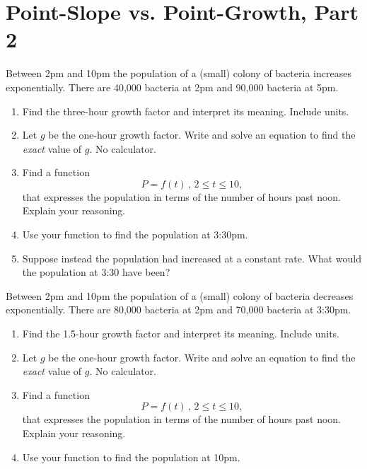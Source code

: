 \documentclass{ximera}
\begin{document}
\section{Point-Slope vs. Point-Growth, Part 2}
\begin{example} \label{Ex578788766}
Between 2pm and 10pm the population of a (small) colony of bacteria increases exponentially. There are 40,000 bacteria at 2pm and 90,000 bacteria at 5pm.

\begin{enumerate}
\item Find the three-hour growth factor and interpret its meaning. Include units.

\item Let $g$ be the one-hour growth factor. Write and solve an equation to find the \emph{exact} value of $g$. No calculator.

\item Find a function 
\[
      P = f(t) \, , \, 2\leq t \leq 10 ,
\]
that expresses the population in terms of the number of hours past noon. Explain your reasoning.

\item Use your function to find the population at 3:30pm.

\item Suppose instead the population had increased at a constant rate. What would the population at 3:30 have been?
\end{enumerate}
\end{example}

\begin{example} \label{Exdf5tr454tt88766}
Between 2pm and 10pm the population of a (small) colony of bacteria decreases exponentially. There are 80,000 bacteria at 2pm and 70,000 bacteria at 3:30pm.

\begin{enumerate}
\item Find the 1.5-hour growth factor and interpret its meaning. Include units.

\item Let $g$ be the one-hour growth factor. Write and solve an equation to find the \emph{exact} value of $g$. No calculator.

\item Find a function 
\[
      P = f(t) \, , \, 2\leq t \leq 10 ,
\]
that expresses the population in terms of the number of hours past noon. Explain your reasoning.

\item Use your function to find the population at 10pm.

\end{enumerate}
\end{example}
\end{document}
